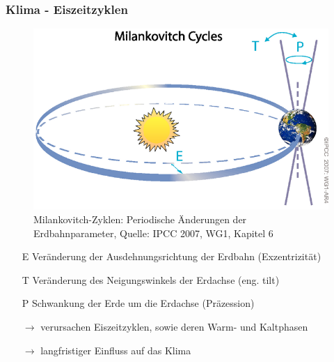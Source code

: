 \begin{frame}
\frametitle{Klima - Eiszeitzyklen}
\begin{figure}
	\centering
	\includegraphics[width=.55\linewidth]{bilder/milankovitch_IPCC2007_AR4.png}
	\caption{Milankovitch-Zyklen: Periodische Änderungen der Erdbahnparameter, Quelle: IPCC 2007, WG1, Kapitel 6}
\end{figure}
\begin{itemize}
	\item[E] Veränderung der Ausdehnungsrichtung der Erdbahn (Exzentrizität)%
	\item[T] Veränderung des Neigungswinkels der Erdachse (eng. tilt)
	\item[P] Schwankung der Erde um die Erdachse (Präzession) %
	\item[$\rightarrow$] verursachen Eiszeitzyklen, sowie deren Warm- und Kaltphasen
	\item[$\rightarrow$] langfristiger Einfluss auf das Klima
\end{itemize}


\end{frame}
